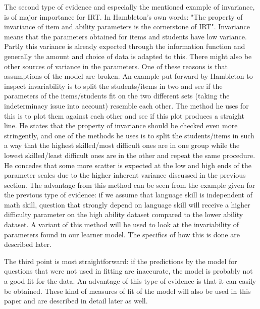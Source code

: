\documentclass{scrartcl}
\begin{document}
The second type of evidence and especially the mentioned example of invariance, is of major importance for IRT. In Hambleton's own words: "The property of invariance of item and ability parameters is the cornerstone of IRT". Invariance means that the parameters obtained for items and students have low variance. Partly this variance is already expected through the information function and generally the amount and choice of data is adapted to this. There might also be other sources of variance in the parameters. One of these reasons is that assumptions of the model are broken. An example put forward by Hambleton to inspect invariability is to split the students/items in two and see if the parameters of the items/students fit on the two different sets (taking the indeterminacy issue into account) resemble each other. The method he uses for this is to plot them against each other and see if this plot produces a straight line. He states that the property of invariance should be checked even more stringently, and one of the methods he uses is to split the students/items in such a way that the highest skilled/most difficult ones are in one group while the lowest skilled/least difficult ones are in the other and repeat the same procedure. He concedes that some more scatter is expected at the low and high ends of the parameter scales due to the higher inherent variance discussed in the previous section. The advantage from this method can be seen from the example given for the previous type of evidence: if we assume that language skill is independent of math skill, question that strongly depend on language skill will receive a higher difficulty parameter on the high ability dataset compared to the lower ability dataset. A variant of this method will be used to look at the invariability of parameters found in our learner model. The specifics of how this is done are described later. 

The third point is most straightforward: if the predictions by the model for questions that were not used in fitting are inaccurate, the model is probably not a good fit for the data. An advantage of this type of evidence is that it can easily be obtained. These kind of measures of fit of the model will also be used in this paper and are described in detail later as well. 
\end{document}
